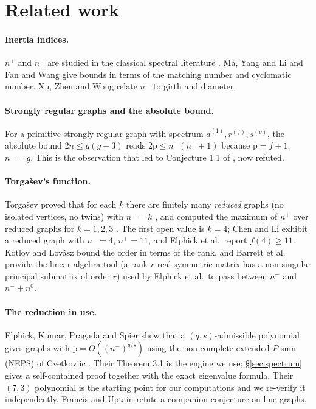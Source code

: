 \documentclass[11pt,a4paper]{article}
\theoremstyle{plain}
\theoremstyle{definition}
\newcommand{\pp}{\mathrm{p}}
\begin{document}
\section{Related work}
\label{sec:related}

\paragraph{Inertia indices.}  $n^+$ and $n^-$ are studied in the classical spectral
literature \cite{CvetkovicDoobSachs1980,BrouwerHaemers2012}.  Ma, Yang and Li
\cite{MaYangLi2013} and Fan and Wang \cite{FanWang2017} give bounds in terms of the
matching number and cyclomatic number.  Xu, Zhen and Wong \cite{XuZhenWong2024} relate
$n^-$ to girth and diameter.

\paragraph{Strongly regular graphs and the absolute bound.}  For a primitive strongly
regular graph with spectrum $d^{(1)},r^{(f)},s^{(g)}$, the absolute bound
$2n\le g(g+3)$ \cite{DelsarteGoethalsSeidel1978} reads $2\pp\le n^-(n^-+1)$ because
$\pp=f+1$, $n^-=g$.  This is the observation that led to Conjecture 1.1 of
\cite{AkbariEtAl2026}, now refuted.

\paragraph{Torga{\v{s}}ev's function.}  Torga{\v{s}}ev proved that for each $k$ there are
finitely many \emph{reduced} graphs (no isolated vertices, no twins) with $n^-=k$
\cite{Torgasev1985a}, and computed the maximum of $n^+$ over reduced graphs for $k=1,2,3$
\cite{Torgasev1985b,Torgasev1989,Torgasev1992}.  The first open value is $k=4$; Chen and
Li \cite{ChenLi2026} exhibit a reduced graph with $n^-=4$, $n^+=11$, and Elphick et
al.\ report $f(4)\ge 11$.  Kotlov and Lov\'asz \cite{KotlovLovasz1996} bound the order in
terms of the rank, and Barrett et al.\ \cite{BarrettEtAl2014} provide the linear-algebra
tool (a rank-$r$ real symmetric matrix has a non-singular principal submatrix of order
$r$) used by Elphick et al.\ to pass between $n^-$ and $n^-+n^0$.

\paragraph{The reduction in use.}  Elphick, Kumar, Pragada and Spier
\cite{ElphickEtAl2026Inertia} show that a $(q,s)$-admissible polynomial gives graphs with
$\pp=\Theta((n^-)^{q/s})$ using the non-complete extended $P$-sum (NEPS) of Cvetkovi\'ic
\cite{Cvetkovic1971,CvetkovicSimic1993}.  Their Theorem 3.1 is the engine we use;
\S\ref{sec:spectrum} gives a self-contained proof together with the exact eigenvalue
formula.  Their $(7,3)$ polynomial is the starting point for our computations and we
re-verify it independently.  Francis and Uptain \cite{FrancisUptain2026} refute a
companion conjecture on line graphs.
\end{document}
